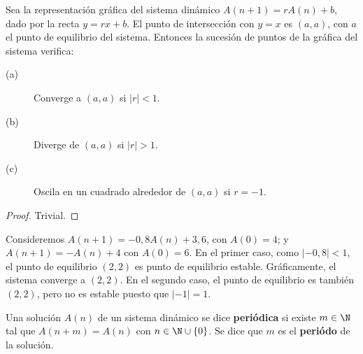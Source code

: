 \begin{ftheorem}[]
\normalfont Sea la representación gráfica del sistema dinámico $\displaystyle A\left(n+1\right) = r A\left(n\right) + b $, dado por la recta $\displaystyle y = rx + b $. El punto de intersección con $\displaystyle y = x $ es $\displaystyle \left(a,a\right) $, con $\displaystyle a $  el punto de equilibrio del sistema. Entonces la sucesión de puntos de la gráfica del sistema verifica:
\begin{description}
\item[(a)] Converge a $\displaystyle \left(a,a\right) $ si $\displaystyle \left|r\right| < 1 $.
\item[(b)] Diverge de $\displaystyle \left(a,a\right) $ si $\displaystyle \left|r\right| > 1 $.
\item[(c)] Oscila en un cuadrado alrededor de $\displaystyle \left(a,a\right) $ si $\displaystyle r = -1 $.
\end{description}
\end{ftheorem}
\begin{proof}
Trivial.
\end{proof}
\begin{eg}
\normalfont Consideremos $\displaystyle A\left(n+1\right) = -0,8A\left(n\right) + 3,6 $, con $\displaystyle A\left(0\right) = 4 $; y $\displaystyle A\left(n+1\right) = -A\left(n\right)+4 $ con $\displaystyle A\left(0\right) = 6 $. En el primer caso, como $\displaystyle \left|-0,8\right| < 1 $, el punto de equilibrio $\displaystyle \left(2,2\right) $ es punto de equilibrio estable. Gráficamente, el sistema converge a $\displaystyle \left(2,2\right) $. En el segundo caso, el punto de equilibrio es también $\displaystyle \left(2,2\right) $, pero no es estable puesto que $\displaystyle \left|-1\right| = 1 $.
\end{eg}
\begin{fdefinition}[]
	\normalfont Una solución $\displaystyle A\left(n\right) $ de un sistema dinámico se dice \textbf{periódica} si existe $\displaystyle m \in \N $ tal que $\displaystyle A\left(n + m\right) = A\left(n\right) $ con $\displaystyle n \in \N \cup \left\{ 0\right\}  $. Se dice que $\displaystyle m $ es el \textbf{periódo} de la solución.
\end{fdefinition}
